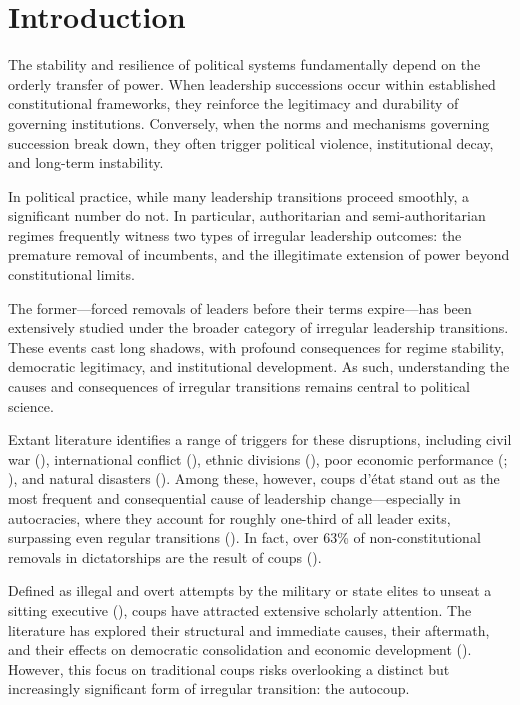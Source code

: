 \documentclass[
  12pt,
]{report}
\begin{document}
\section{Introduction}\label{introduction-1}

The stability and resilience of political systems fundamentally depend
on the orderly transfer of power. When leadership successions occur
within established constitutional frameworks, they reinforce the
legitimacy and durability of governing institutions. Conversely, when
the norms and mechanisms governing succession break down, they often
trigger political violence, institutional decay, and long-term
instability.

In political practice, while many leadership transitions proceed
smoothly, a significant number do not. In particular, authoritarian and
semi-authoritarian regimes frequently witness two types of irregular
leadership outcomes: the premature removal of incumbents, and the
illegitimate extension of power beyond constitutional limits.

The former---forced removals of leaders before their terms expire---has
been extensively studied under the broader category of irregular
leadership transitions. These events cast long shadows, with profound
consequences for regime stability, democratic legitimacy, and
institutional development. As such, understanding the causes and
consequences of irregular transitions remains central to political
science.

Extant literature identifies a range of triggers for these disruptions,
including civil war (), international conflict (), ethnic divisions
(), poor
economic performance (;
), and natural
disasters (). Among these, however, coups d'état stand out as the most
frequent and consequential cause of leadership change---especially in
autocracies, where they account for roughly one-third of all leader
exits, surpassing even regular transitions
(). In fact, over 63\%
of non-constitutional removals in dictatorships are the result of coups
().

Defined as illegal and overt attempts by the military or state elites to
unseat a sitting executive (), coups have attracted extensive scholarly attention. The
literature has explored their structural and immediate causes, their
aftermath, and their effects on democratic consolidation and economic
development (). However,
this focus on traditional coups risks overlooking a distinct but
increasingly significant form of irregular transition: the autocoup.
\end{document}
